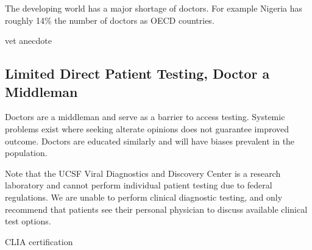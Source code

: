 \documentclass{article}
\begin{document}

The developing world has a major shortage of doctors. For example Nigeria has roughly 14\% the number of doctors as OECD countries. \cite{wef2014}


vet anecdote



\cite{ferguson2007patients}

\subsection{Limited Direct Patient Testing, Doctor a Middleman}

Doctors are a middleman and serve as a barrier to access testing. Systemic problems exist where seeking alterate opinions does not guarantee improved outcome. Doctors are educated similarly and will have biases prevalent in the population. 



Note that the UCSF Viral Diagnostics and Discovery Center is a research laboratory and cannot perform individual patient testing due to federal regulations. We are unable to perform clinical diagnostic testing, and only recommend that patients see their personal physician to discuss available clinical test options.

CLIA certification

\end{document}
